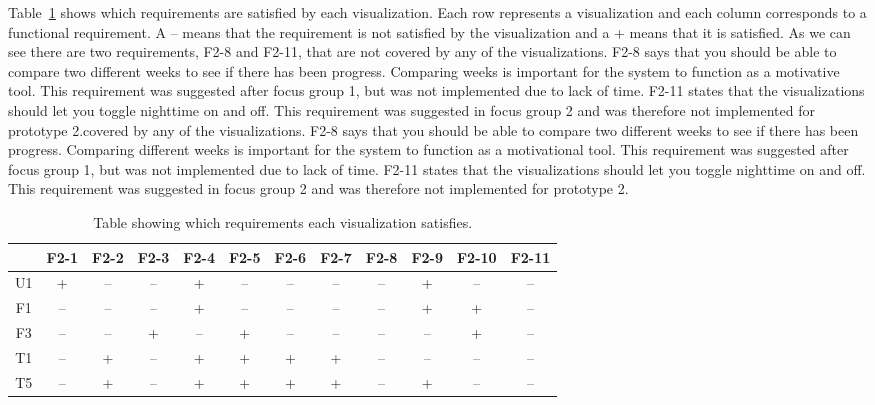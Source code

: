 Table~\ref{tab:reqSat} shows which requirements are satisfied by each visualization. Each row represents a visualization and each column corresponds to a functional requirement. A -- means that the requirement is not satisfied by the visualization and a + means that it is satisfied. As we can see there are two requirements, F2-8 and F2-11, that are not covered by any of the visualizations. F2-8 says that you should be able to compare two different weeks to see if there has been progress. Comparing weeks is important for the system to function as a motivative tool. This requirement was suggested after focus group 1, but was not implemented due to lack of time. F2-11 states that the visualizations should let you toggle nighttime on and off. This requirement was suggested in focus group 2 and was therefore not implemented for prototype 2.covered by any of the visualizations. F2-8 says that you should be able to compare two different weeks to see if there has been progress. Comparing different weeks is important for the system to function as a motivational tool. This requirement was suggested after focus group 1, but was not implemented due to lack of time. F2-11 states that the visualizations should let you toggle nighttime on and off. This requirement was suggested in focus group 2 and was therefore not implemented for prototype 2.

\begin{table}[h!]
  \centering
  \begin{tabular}{|c|c|c|c|c|c|c|c|c|c|c|c|}
    \hline
    & F2-1 & F2-2 & F2-3 & F2-4 & F2-5 & F2-6 & F2-7 & F2-8 & F2-9 & F2-10 & F2-11 \\ \hline
    U1 & + & -- & -- & + & -- & -- & -- & -- & + & -- & -- \\ \hline
    F1 & -- & -- & -- & + & -- & -- & -- & -- & + & + & -- \\ \hline
    F3 & -- & -- & + & -- & + & -- & -- & -- & -- & + & -- \\ \hline
    T1 & -- & + & -- & + & + & + & + & -- & -- & -- & -- \\ \hline
    T5 & -- & + & -- & + & + & + & + & -- & + & -- & -- \\ \hline
  \end{tabular}
  \caption{Table showing which requirements each visualization satisfies.}
  \label{tab:reqSat}
\end{table}

